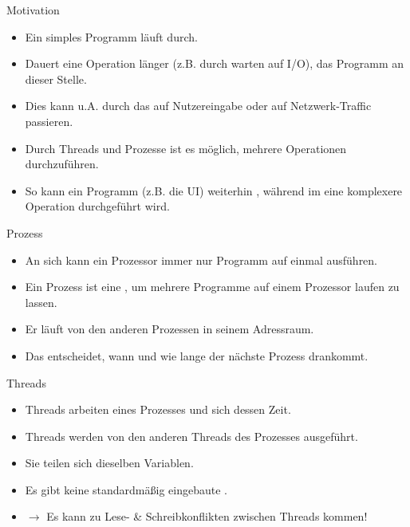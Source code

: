\documentclass[12pt, aspectratio=169, usepdftitle=false]{beamer}
\begin{document}
\begin{frame}[fragile]{Motivation}
	\begin{itemize}
		\item Ein simples Programm läuft  durch.
		\pause
		\item[] Dauert eine Operation länger (z.B. durch warten auf I/O),  das Programm an dieser Stelle.
		\item[] Dies kann u.A. durch das  auf Nutzereingabe oder auf Netzwerk-Traffic passieren.
		\pause
		\item Durch Threads und Prozesse ist es möglich, mehrere Operationen  durchzuführen.
		\item[] So kann ein Programm (z.B. die UI) weiterhin , während im  eine komplexere Operation durchgeführt wird.

	\end{itemize}
\end{frame}



\begin{frame}[fragile]{Prozess}
	\begin{itemize}
		\item An sich kann ein Prozessor immer nur  Programm auf einmal ausführen.
		\pause
		\item Ein Prozess ist eine , um mehrere Programme  auf einem Prozessor laufen zu lassen.
		\pause
		\item Er läuft  von den anderen Prozessen in seinem  Adressraum.
		\pause
		\item Das  entscheidet, wann und wie lange der nächste Prozess drankommt.
	\end{itemize}
\end{frame}


\begin{frame}[fragile]{Threads}
	\begin{itemize}
		\item Threads arbeiten  eines Prozesses und  sich dessen Zeit.
		\pause

		\item Threads werden  von den anderen Threads des Prozesses ausgeführt.
		\pause
		
		\item Sie teilen sich dieselben  Variablen.
		\pause
		
		\item[] Es gibt keine standardmäßig eingebaute .
		
		\item[] $\rightarrow$ Es kann zu Lese- \& Schreibkonflikten zwischen Threads kommen!
	\end{itemize}

\end{frame}
\end{document}
